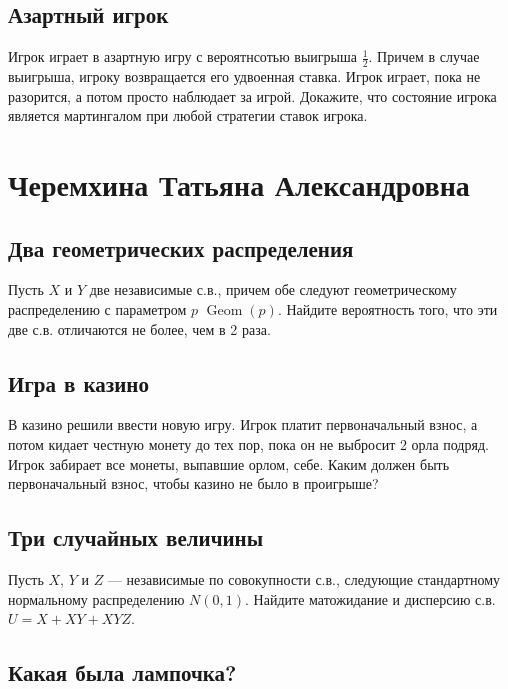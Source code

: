 \documentclass[12pt]{article}
\DeclareMathOperator{\Geom}{Geom}
\begin{document}
\subsection{Азартный игрок}

Игрок играет в азартную игру с вероятнсотью выигрыша $\frac{1}{2}$. Причем в случае выигрыша, игроку возвращается его удвоенная ставка. Игрок играет, пока не разорится, а потом просто наблюдает за игрой. Докажите, что состояние игрока является мартингалом при любой стратегии ставок игрока.



\newpage
\section{Черемхина Татьяна Александровна}

\subsection{Два геометрических распределения}

Пусть $X$ и $Y$ две независимые с.в., причем обе следуют геометрическому распределению с параметром $p$ $\Geom(p)$. Найдите вероятность того, что эти две с.в. отличаются не более, чем в 2 раза.



\subsection{Игра в казино}

В казино решили ввести новую игру. Игрок платит первоначальный взнос, а потом кидает честную монету до тех пор, пока он не выбросит 2 орла подряд. Игрок забирает все монеты, выпавшие орлом, себе. Каким должен быть первоначальный взнос, чтобы казино не было в проигрыше?



\subsection{Три случайных величины}

Пусть $X$, $Y$ и $Z$ --- независимые по совокупности с.в., следующие стандартному нормальному распределению $N(0, 1)$. Найдите матожидание и дисперсию с.в. $U = X + XY + XYZ$. 



\subsection{Какая была лампочка?}
\end{document}
